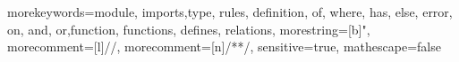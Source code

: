  {
	morekeywords={module, imports,type, rules, definition, of, where, has, else, error, on, and, or,function, functions, defines, relations},
  morestring=[b]",
	morecomment=[l]{//},
	morecomment=[n]{/*}{*/},
  sensitive=true,
  mathescape=false
}

\newcommand{\tscode}[1]{\lstinline[language=TS,basicstyle=\lstinlinestyle,breaklines=false]{#1}}
\newcommand{\tscodebl}[1]{\lstinline[language=TS,basicstyle=\lstinlinestyle,breaklines=true]{#1}}
\newcommand{\TS}{\langname{TS}}
